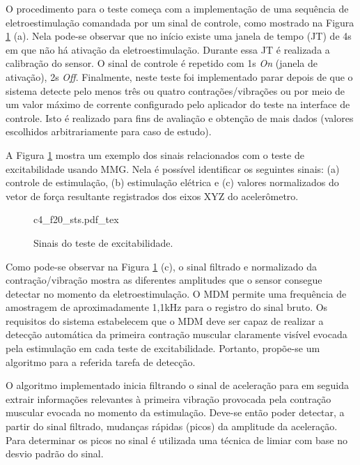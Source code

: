 O procedimento para o teste começa com a implementação de uma sequência de eletroestimulação comandada por um sinal de controle, como mostrado na Figura \ref{fig:c4_f20_sts} (a). Nela pode-se observar que no início existe uma janela de tempo (\acrshort{JT}) de 4s em que não há ativação da eletroestimulação. Durante essa \acrshort{JT} é realizada a calibração do sensor. O sinal de controle é repetido com 1s \textit{On} (janela de ativação), 2s \textit{Off}. Finalmente, neste teste foi implementado parar depois de que o sistema detecte pelo menos três ou quatro contrações/vibrações ou por meio de um valor máximo de corrente configurado pelo aplicador do teste na interface de controle. Isto é realizado para fins de avaliação e obtenção de mais dados (valores escolhidos arbitrariamente para caso de estudo).

A Figura \ref{fig:c4_f20_sts} mostra um exemplo dos sinais relacionados com o teste de excitabilidade usando \acrshort{MMG}. Nela é possível identificar os seguintes sinais: (a) controle de estimulação, (b) estimulação elétrica e (c) valores normalizados do vetor de força resultante registrados dos eixos XYZ do acelerômetro.

\begin{figure}
    \centering %
    \small %
    \def\svgwidth{1\columnwidth}%
    {c4_f20_sts.pdf_tex}
    \caption{Sinais do teste de excitabilidade.}
    \label{fig:c4_f20_sts}
\end{figure}

Como pode-se observar na Figura \ref{fig:c4_f20_sts} (c), o sinal filtrado e normalizado da contração/vibração mostra as diferentes amplitudes que o sensor consegue detectar no momento da eletroestimulação. O \acrshort{MDM} permite uma frequência de amostragem de aproximadamente 1,1kHz para o registro do sinal bruto. Os requisitos do sistema estabelecem que o \acrshort{MDM} deve ser capaz de realizar a detecção automática da primeira contração muscular claramente visível evocada pela estimulação em cada teste de excitabilidade. Portanto, propõe-se um algoritmo para a referida tarefa de detecção. 

O algoritmo implementado inicia filtrando o sinal de aceleração para em seguida extrair informações relevantes à primeira vibração provocada pela contração muscular evocada no momento da estimulação. Deve-se então poder detectar, a partir do sinal filtrado, mudanças rápidas (picos) da amplitude da aceleração. Para determinar os picos no sinal é utilizada uma técnica de limiar com base no desvio padrão do sinal.

